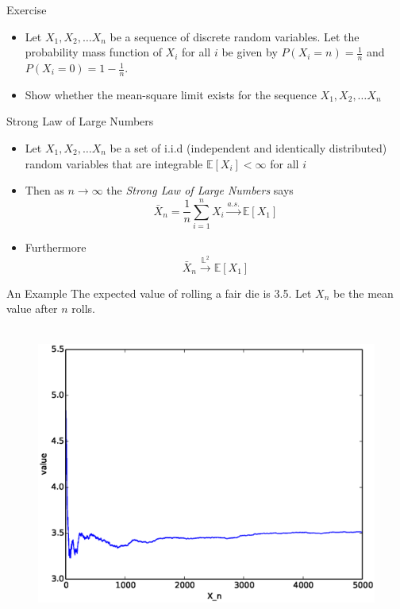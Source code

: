 \documentclass{beamer}
\begin{document}
\begin{frame}{Exercise} 
\begin{itemize} 
\item Let $X_1, X_2, \ldots X_n$  be a sequence of discrete random variables. Let the probability mass function of $X_i$ for all $i$ be given by $P(X_i = n) = \frac{1}{n}$ and $P(X_i = 0) = 1-\frac{1}{n}$. 
\item Show whether the mean-square limit exists for the sequence $X_1, X_2, \ldots X_n$
\end{itemize}
\end{frame}

\begin{frame}{Strong Law of Large Numbers} 
\begin{itemize}
 \item Let $X_1, X_2, \ldots X_n$ be a set of i.i.d (independent and identically distributed) random variables that are integrable $\mathbb{E}[X_i] < \infty$ for all $i$
 \item Then as $n \rightarrow \infty$ the \emph{Strong Law of Large Numbers} says
 \begin{displaymath} 
  \bar{X}_n = \frac{1}{n}\sum_{i=1}^n X_i \xrightarrow{a.s.} \mathbb{E}[X_1]
 \end{displaymath}
\item Furthermore 
\begin{displaymath} 
 \bar{X}_n \xrightarrow{\mathbb{L}^2} \mathbb{E}[X_1]
\end{displaymath}
\end{itemize}
\end{frame}

\begin{frame}{An Example}
The expected value of rolling a fair die is 3.5. Let $X_n$ be the mean value after $n$ rolls. 
\begin{figure}[htp]
\mbox{
\includegraphics[width=0.5\linewidth]{LawLargeNumbers.eps}
}
\end{figure} 
\end{frame}
\end{document}
